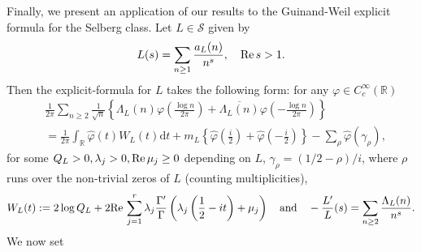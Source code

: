 \documentclass[a4paper,reqno,12pt]{amsart}
\renewcommand{\S}{\mathcal{S}}
\renewcommand{\r}{\mathbb{R}}
\newcommand{\ft}{\widehat}
\newcommand{\la}{\lambda}
\newcommand{\ga}{\gamma}
\newcommand{\p}{\varphi}
\renewcommand{\d}{\mathrm{d}}
\newcommand{\ov}[1]{\overline{#1}}
\newcommand{\1}{{\bf 1}}
\renewcommand{\Re}{{\rm Re}\,}
\begin{document}
Finally, we present an application of our results to the Guinand-Weil explicit formula for the Selberg class. Let $L\in\S$ given by
\begin{align*}
    L(s)=\sum_{n\geq1} \frac{a_L(n)}{n^s}, \quad \Re{s}>1.
\end{align*}
Then the explicit-formula for $L$ takes the following form: for any $\p\in C^\infty_c(\r)$
\begin{align*}
     &\frac{1}{2\pi}\sum_{n\geq2}\frac{1}{\sqrt n}
    \left\{
    \Lambda_L(n)\p\left(\frac{\log n}{2\pi}\right)
    +\ov{\Lambda_L(n)}\p\left(-\frac{\log n}{2\pi}\right)
    \right\}\\
    &=\frac{1}{2\pi}\int_{\r}\ft{\p}(t)W_L(t)\d t+m_L\left\{\ft{\p}\left(\frac{i}{2}\right)
    +\ft{\p}\left(-\frac{i}{2}\right)\right\}
    -\sum_{\rho}\ft{\p}(\ga_\rho),
\end{align*}
for some $Q_L>0,\la_j>0, \Re{\mu_j}\geq0$ depending on $L$, $\ga_\rho=(1/2-\rho)/i$, where $\rho$ runs over the non-trivial zeros of $L$ (counting multiplicities),
\begin{align*}
    W_L(t):=2\log Q_L+2\Re\sum_{j=1}^r
    \lambda_j\frac{\Gamma'}{\Gamma}
    \left(\lambda_j\left(\frac12-it\right)+\mu_j\right)\quad \text{and} \quad -\frac{L'}{L}(s)=\sum_{n\geq2} \frac{\Lambda_L(n)}{n^s}.
\end{align*}
We now set
\end{document}
